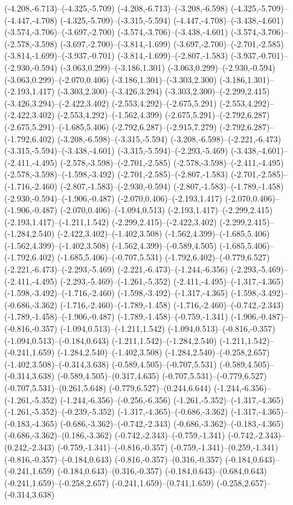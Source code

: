 \begin{scope}
(-4.208,-6.713)--(-4.325,-5.709) (-4.208,-6.713)--(-3.208,-6.598) (-4.325,-5.709)--(-4.447,-4.708) (-4.325,-5.709)--(-3.315,-5.594) (-4.447,-4.708)--(-3.438,-4.601) (-3.574,-3.706)--(-3.697,-2.700) (-3.574,-3.706)--(-3.438,-4.601) (-3.574,-3.706)--(-2.578,-3.598) (-3.697,-2.700)--(-3.814,-1.699) (-3.697,-2.700)--(-2.701,-2.585) (-3.814,-1.699)--(-3.937,-0.701) (-3.814,-1.699)--(-2.807,-1.583) (-3.937,-0.701)--(-2.930,-0.594) (-3.063,0.299)--(-3.186,1.301) (-3.063,0.299)--(-2.930,-0.594) (-3.063,0.299)--(-2.070,0.406) (-3.186,1.301)--(-3.303,2.300) (-3.186,1.301)--(-2.193,1.417) (-3.303,2.300)--(-3.426,3.294) (-3.303,2.300)--(-2.299,2.415) (-3.426,3.294)--(-2.422,3.402) (-2.553,4.292)--(-2.675,5.291) (-2.553,4.292)--(-2.422,3.402) (-2.553,4.292)--(-1.562,4.399) (-2.675,5.291)--(-2.792,6.287) (-2.675,5.291)--(-1.685,5.406) (-2.792,6.287)--(-2.915,7.279) (-2.792,6.287)--(-1.792,6.402) (-3.208,-6.598)--(-3.315,-5.594) (-3.208,-6.598)--(-2.221,-6.473) (-3.315,-5.594)--(-3.438,-4.601) (-3.315,-5.594)--(-2.293,-5.469) (-3.438,-4.601)--(-2.411,-4.495) (-2.578,-3.598)--(-2.701,-2.585) (-2.578,-3.598)--(-2.411,-4.495) (-2.578,-3.598)--(-1.598,-3.492) (-2.701,-2.585)--(-2.807,-1.583) (-2.701,-2.585)--(-1.716,-2.460) (-2.807,-1.583)--(-2.930,-0.594) (-2.807,-1.583)--(-1.789,-1.458) (-2.930,-0.594)--(-1.906,-0.487) (-2.070,0.406)--(-2.193,1.417) (-2.070,0.406)--(-1.906,-0.487) (-2.070,0.406)--(-1.094,0.513) (-2.193,1.417)--(-2.299,2.415) (-2.193,1.417)--(-1.211,1.542) (-2.299,2.415)--(-2.422,3.402) (-2.299,2.415)--(-1.284,2.540) (-2.422,3.402)--(-1.402,3.508) (-1.562,4.399)--(-1.685,5.406) (-1.562,4.399)--(-1.402,3.508) (-1.562,4.399)--(-0.589,4.505) (-1.685,5.406)--(-1.792,6.402) (-1.685,5.406)--(-0.707,5.531) (-1.792,6.402)--(-0.779,6.527) (-2.221,-6.473)--(-2.293,-5.469) (-2.221,-6.473)--(-1.244,-6.356) (-2.293,-5.469)--(-2.411,-4.495) (-2.293,-5.469)--(-1.261,-5.352) (-2.411,-4.495)--(-1.317,-4.365) (-1.598,-3.492)--(-1.716,-2.460) (-1.598,-3.492)--(-1.317,-4.365) (-1.598,-3.492)--(-0.686,-3.362) (-1.716,-2.460)--(-1.789,-1.458) (-1.716,-2.460)--(-0.742,-2.343) (-1.789,-1.458)--(-1.906,-0.487) (-1.789,-1.458)--(-0.759,-1.341) (-1.906,-0.487)--(-0.816,-0.357) (-1.094,0.513)--(-1.211,1.542) (-1.094,0.513)--(-0.816,-0.357) (-1.094,0.513)--(-0.184,0.643) (-1.211,1.542)--(-1.284,2.540) (-1.211,1.542)--(-0.241,1.659) (-1.284,2.540)--(-1.402,3.508) (-1.284,2.540)--(-0.258,2.657) (-1.402,3.508)--(-0.314,3.638) (-0.589,4.505)--(-0.707,5.531) (-0.589,4.505)--(-0.314,3.638) (-0.589,4.505)--(0.317,4.635) (-0.707,5.531)--(-0.779,6.527) (-0.707,5.531)--(0.261,5.648) (-0.779,6.527)--(0.244,6.644) (-1.244,-6.356)--(-1.261,-5.352) (-1.244,-6.356)--(-0.256,-6.356) (-1.261,-5.352)--(-1.317,-4.365) (-1.261,-5.352)--(-0.239,-5.352) (-1.317,-4.365)--(-0.686,-3.362) (-1.317,-4.365)--(-0.183,-4.365) (-0.686,-3.362)--(-0.742,-2.343) (-0.686,-3.362)--(-0.183,-4.365) (-0.686,-3.362)--(0.186,-3.362) (-0.742,-2.343)--(-0.759,-1.341) (-0.742,-2.343)--(0.242,-2.343) (-0.759,-1.341)--(-0.816,-0.357) (-0.759,-1.341)--(0.259,-1.341) (-0.816,-0.357)--(-0.184,0.643) (-0.816,-0.357)--(0.316,-0.357) (-0.184,0.643)--(-0.241,1.659) (-0.184,0.643)--(0.316,-0.357) (-0.184,0.643)--(0.684,0.643) (-0.241,1.659)--(-0.258,2.657) (-0.241,1.659)--(0.741,1.659) (-0.258,2.657)--(-0.314,3.638) 
\end{scope}
